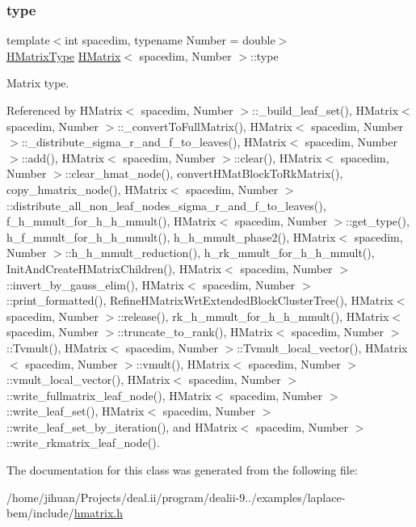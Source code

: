 \mbox{\label{classHMatrix_a89ef60f3ba737c04708195ca0bb13620}} 
\subsubsection{\texorpdfstring{type}{type}}
{\footnotesize\ttfamily template$<$int spacedim, typename Number = double$>$ \\
\hyperlink{hmatrix_8h_ac04719e202c88f36e4533fe1d326a494}{H\+Matrix\+Type} \hyperlink{classHMatrix}{H\+Matrix}$<$ spacedim, Number $>$\+::type\hspace{0.3cm}{\ttfamily [private]}}

Matrix type. 

Referenced by H\+Matrix$<$ spacedim, Number $>$\+::\+\_\+build\+\_\+leaf\+\_\+set(), H\+Matrix$<$ spacedim, Number $>$\+::\+\_\+convert\+To\+Full\+Matrix(), H\+Matrix$<$ spacedim, Number $>$\+::\+\_\+distribute\+\_\+sigma\+\_\+r\+\_\+and\+\_\+f\+\_\+to\+\_\+leaves(), H\+Matrix$<$ spacedim, Number $>$\+::add(), H\+Matrix$<$ spacedim, Number $>$\+::clear(), H\+Matrix$<$ spacedim, Number $>$\+::clear\+\_\+hmat\+\_\+node(), convert\+H\+Mat\+Block\+To\+Rk\+Matrix(), copy\+\_\+hmatrix\+\_\+node(), H\+Matrix$<$ spacedim, Number $>$\+::distribute\+\_\+all\+\_\+non\+\_\+leaf\+\_\+nodes\+\_\+sigma\+\_\+r\+\_\+and\+\_\+f\+\_\+to\+\_\+leaves(), f\+\_\+h\+\_\+mmult\+\_\+for\+\_\+h\+\_\+h\+\_\+mmult(), H\+Matrix$<$ spacedim, Number $>$\+::get\+\_\+type(), h\+\_\+f\+\_\+mmult\+\_\+for\+\_\+h\+\_\+h\+\_\+mmult(), h\+\_\+h\+\_\+mmult\+\_\+phase2(), H\+Matrix$<$ spacedim, Number $>$\+::h\+\_\+h\+\_\+mmult\+\_\+reduction(), h\+\_\+rk\+\_\+mmult\+\_\+for\+\_\+h\+\_\+h\+\_\+mmult(), Init\+And\+Create\+H\+Matrix\+Children(), H\+Matrix$<$ spacedim, Number $>$\+::invert\+\_\+by\+\_\+gauss\+\_\+elim(), H\+Matrix$<$ spacedim, Number $>$\+::print\+\_\+formatted(), Refine\+H\+Matrix\+Wrt\+Extended\+Block\+Cluster\+Tree(), H\+Matrix$<$ spacedim, Number $>$\+::release(), rk\+\_\+h\+\_\+mmult\+\_\+for\+\_\+h\+\_\+h\+\_\+mmult(), H\+Matrix$<$ spacedim, Number $>$\+::truncate\+\_\+to\+\_\+rank(), H\+Matrix$<$ spacedim, Number $>$\+::\+Tvmult(), H\+Matrix$<$ spacedim, Number $>$\+::\+Tvmult\+\_\+local\+\_\+vector(), H\+Matrix$<$ spacedim, Number $>$\+::vmult(), H\+Matrix$<$ spacedim, Number $>$\+::vmult\+\_\+local\+\_\+vector(), H\+Matrix$<$ spacedim, Number $>$\+::write\+\_\+fullmatrix\+\_\+leaf\+\_\+node(), H\+Matrix$<$ spacedim, Number $>$\+::write\+\_\+leaf\+\_\+set(), H\+Matrix$<$ spacedim, Number $>$\+::write\+\_\+leaf\+\_\+set\+\_\+by\+\_\+iteration(), and H\+Matrix$<$ spacedim, Number $>$\+::write\+\_\+rkmatrix\+\_\+leaf\+\_\+node().



The documentation for this class was generated from the following file\+:\begin{DoxyCompactItemize}
\item 
/home/jihuan/\+Projects/deal.\+ii/program/dealii-\/9../examples/laplace-\/bem/include/\hyperlink{hmatrix_8h}{hmatrix.\+h}\end{DoxyCompactItemize}
